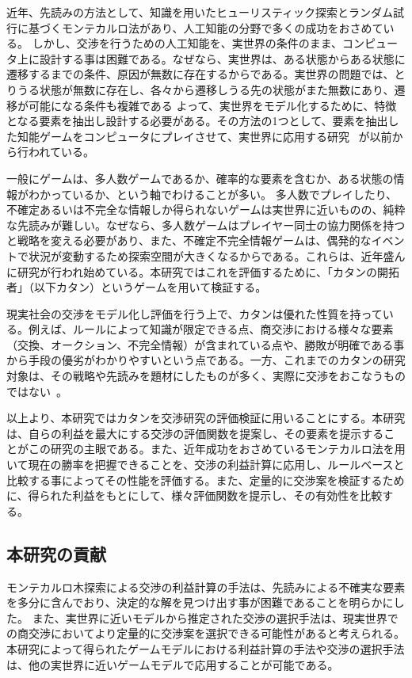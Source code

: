 \documentclass[a4, 10pt,dvipdfmx]{jsarticle}
\begin{document}
近年、先読みの方法として、知識を用いたヒューリスティック探索とランダム試行に基づくモンテカルロ法があり、人工知能の分野で多くの成功をおさめている。
しかし、交渉を行うための人工知能を、実世界の条件のまま、コンピュータ上に設計する事は困難である。なぜなら、実世界は、ある状態からある状態に遷移するまでの条件、原因が無数に存在するからである。実世界の問題では、とりうる状態が無数に存在し、各々から遷移しうる先の状態がまた無数にあり、遷移が可能になる条件も複雑である
よって、実世界をモデル化するために、特徴となる要素を抽出し設計する必要がある。その方法の1つとして、要素を抽出した知能ゲームをコンピュータにプレイさせて、実世界に応用する研究 ~\cite{川越敏司2010行動ゲーム理論入門}が以前から行われている。

一般にゲームは、多人数ゲームであるか、確率的な要素を含むか、ある状態の情報がわかっているか、という軸でわけることが多い。
多人数でプレイしたり、不確定あるいは不完全な情報しか得られないゲームは実世界に近いものの、純粋な先読みが難しい。なぜなら、多人数ゲームはプレイヤー同士の協力関係を持つと戦略を変える必要があり、また、不確定不完全情報ゲームは、偶発的なイベントで状況が変動するため探索空間が大きくなるからである。これらは、近年盛んに研究が行われ始めている。本研究ではこれを評価するために、「カタンの開拓者」（以下カタン）というゲームを用いて検証する。

現実社会の交渉をモデル化し評価を行う上で、カタンは優れた性質を持っている。例えば、ルールによって知識が限定できる点、商交渉における様々な要素（交換、オークション、不完全情報）が含まれている点や、勝敗が明確である事から手段の優劣がわかりやすいという点である。一方、これまでのカタンの研究対象は、その戦略や先読みを題材にしたものが多く、実際に交渉をおこなうものではない~\cite{kocsis2006bandit,schadd2009monte}。

以上より、本研究ではカタンを交渉研究の評価検証に用いることにする。本研究は、自らの利益を最大にする交渉の評価関数を提案し、その要素を提示することがこの研究の主眼である。また、近年成功をおさめているモンテカルロ法を用いて現在の勝率を把握できることを、交渉の利益計算に応用し、ルールベースと比較する事によってその性能を評価する。また、定量的に交渉案を検証するために、得られた利益をもとにして、様々評価関数を提示し、その有効性を比較する。

\subsection{本研究の貢献}
モンテカルロ木探索による交渉の利益計算の手法は、先読みによる不確実な要素を多分に含んでおり、決定的な解を見つけ出す事が困難であることを明らかにした。
また、実世界に近いモデルから推定された交渉の選択手法は、現実世界での商交渉においてより定量的に交渉案を選択できる可能性があると考えられる。
本研究によって得られたゲームモデルにおける利益計算の手法や交渉の選択手法は、他の実世界に近いゲームモデルで応用することが可能である。
\end{document}
